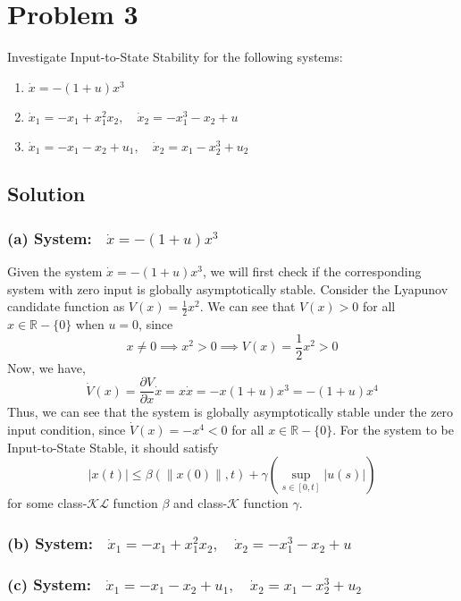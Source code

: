 \section*{Problem 3}

Investigate Input-to-State Stability for the following systems:
\begin{enumerate}[label= (\alph*)]
    \item \( \dot{x}=-(1+u) x^{3} \)
    \item \( \dot{x}_{1}=-x_{1}+x_{1}^{2} x_{2}, \quad \dot{x}_{2}=-x_{1}^{3}-x_{2}+u \)
    \item \( \dot{x}_{1}=-x_{1}-x_{2}+u_{1}, \quad \dot{x}_{2}=x_{1}-x_{2}^{3}+u_{2} \)
\end{enumerate}

\subsection*{Solution}

\subsubsection*{(a) System:\( \quad \dot{x}=-(1+u) x^{3} \)}

Given the system \( \dot{x}=-(1+u) x^{3} \), we will first check if the corresponding system with zero input is globally asymptotically stable.
Consider the Lyapunov candidate function as \( V(x)=\frac{1}{2} x^{2} \).
We can see that \( V(x) > 0 \) for all \( x \in \mathbb{R} - \{ 0 \} \) when \( u = 0 \), since
\begin{equation*}
    x \neq 0
    \implies
    x^2 > 0
    \implies
    V(x)
    =
    \frac{1}{2} x^2 > 0
\end{equation*}
Now, we have,
\begin{equation*}
    \dot{V}(x)
    =
    \frac{\partial V}{\partial x} \dot{x}
    =
    x \dot{x}
    =
    -x (1 + u) x^3
    =
    -(1 + u) x^4
\end{equation*}
Thus, we can see that the system is globally asymptotically stable under the zero input condition, since \( \dot{V}(x) = -x^4 < 0 \) for all \( x \in \mathbb{R} - \{ 0 \} \).
For the system to be Input-to-State Stable, it should satisfy
\begin{equation*}
    \left| x(t) \right| \leq \beta( \| x(0) \|, t ) + \gamma( \sup_{s \in [0, t]} \left| u(s) \right| )
\end{equation*}
for some class-\( \mathcal{KL} \) function \( \beta \) and class-\( \mathcal{K} \) function \( \gamma \).

\subsubsection*{(b) System:\( \quad \dot{x}_{1}=-x_{1}+x_{1}^{2} x_{2}, \quad \dot{x}_{2}=-x_{1}^{3}-x_{2}+u \)}

\subsubsection*{(c) System:\( \quad \dot{x}_{1}=-x_{1}-x_{2}+u_{1}, \quad \dot{x}_{2}=x_{1}-x_{2}^{3}+u_{2} \)}
